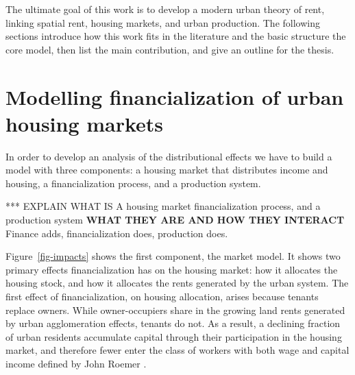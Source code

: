 The ultimate goal of this work is to develop a modern urban theory of rent, linking spatial rent, housing markets, and urban production. The following sections introduce how this work fits in the literature and the basic structure the core model, then list the main contribution, and give an outline for the thesis.

\section{Modelling financialization of urban housing markets}
In order to develop an analysis of the distributional effects we have to build a model with three components: a housing market that distributes income and housing, a financialization process, and a production system. 

*** EXPLAIN WHAT IS A housing market financialization process, and a production system 
\textbf{WHAT THEY ARE AND HOW THEY INTERACT} Finance adds, financialization does, production does.

Figure~\ref{fig-impacts} shows the first component, the market model.
It shows two primary effects financialization has on the housing market: how it allocates %
the housing stock, and how it allocates the \glspl{rent} generated by the urban system. %
The first effect of financialization, on housing allocation, arises because tenants replace owners. While owner-occupiers share in the growing land rents generated by urban agglomeration effects, tenants do not. As a result, a declining fraction of urban residents accumulate capital through their participation in the housing market, and therefore fewer enter the class of workers with both wage and capital income defined by John Roemer \cite{roemerGeneralTheoryExploitation1982}. 

